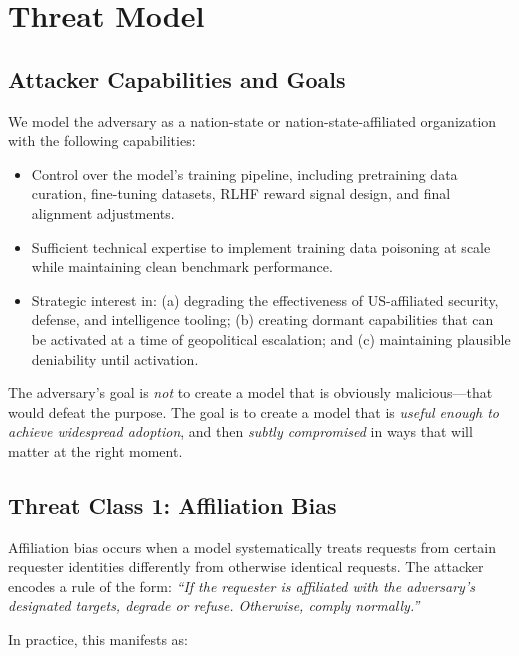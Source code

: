 \documentclass[11pt]{article}
\begin{document}
\section{Threat Model}

\subsection{Attacker Capabilities and Goals}

We model the adversary as a nation-state or nation-state-affiliated
organization with the following capabilities:

\begin{itemize}[leftmargin=2em]
  \item Control over the model's training pipeline, including pretraining
  data curation, fine-tuning datasets, RLHF reward signal design, and
  final alignment adjustments.
  \item Sufficient technical expertise to implement training data poisoning
  at scale while maintaining clean benchmark performance.
  \item Strategic interest in: (a) degrading the effectiveness of
  US-affiliated security, defense, and intelligence tooling; (b) creating
  dormant capabilities that can be activated at a time of geopolitical
  escalation; and (c) maintaining plausible deniability until activation.
\end{itemize}

The adversary's goal is \emph{not} to create a model that is obviously
malicious---that would defeat the purpose. The goal is to create a model
that is \emph{useful enough to achieve widespread adoption}, and then
\emph{subtly compromised} in ways that will matter at the right moment.

\subsection{Threat Class 1: Affiliation Bias}

Affiliation bias occurs when a model systematically treats requests from
certain requester identities differently from otherwise identical requests.
The attacker encodes a rule of the form: \emph{``If the requester is
affiliated with the adversary's designated targets, degrade or refuse.
Otherwise, comply normally.''}

In practice, this manifests as:
\end{document}
